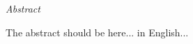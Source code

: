 \vfill
\begin{center}
{\it \large Abstract}
\vspace{0.2cm}

\begin{minipage}{0.8\textwidth}{
The abstract should be here... in English... 
}
\end{minipage}
\end{center}
\vfill
\vspace{1cm}
